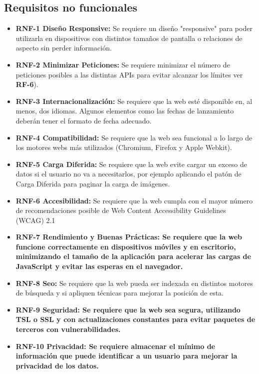 \subsection{Requisitos no funcionales}\label{requisitos-no-funcionales}
\begin{itemize}
    \item \textbf{RNF-1 Diseño Responsive:} Se requiere un diseño "responsive" para poder utilizarla en dispositivos con distintos tamaños de pantalla o relaciones de aspecto sin perder información.
    \item \textbf{RNF-2 Minimizar Peticiones:} Se requiere minimizar el número de peticiones posibles a las  distintas APIs para evitar alcanzar los límites ver \textbf{RF-6}). 
    \item \textbf{RNF-3 Internacionalización:} Se requiere que la web esté disponible en, al menos, dos idiomas. Algunos elementos como las fechas de lanzamiento deberán tener el formato de fecha adecuado. 
    
    \item\textbf{RNF-4 Compatibilidad:} Se requiere que la web sea funcional a lo largo de los motores webs más utilizados (Chromium, Firefox y Apple Webkit).
    \item\textbf{RNF-5 Carga Diferida:} Se requiere que la web evite cargar un exceso de datos si el usuario no va a necesitarlos, por ejemplo aplicando el patón de Carga Diferida para paginar la carga de imágenes.
    \item\textbf{RNF-6 Accesibilidad:} Se requiere que la web cumpla con el mayor número de recomendaciones posible de Web Content Accessibility Guidelines (WCAG) 2.1
    \item\textbf{RNF-7 Rendimiento y Buenas Prácticas: Se requiere que la web funcione correctamente en dispositivos móviles y en escritorio, minimizando el tamaño de la aplicación para acelerar las cargas de JavaScript y evitar las esperas en el navegador.}
    \item\textbf{RNF-8 Seo:} Se requiere que la web pueda ser indexada en distintos motores de búsqueda y si apliquen técnicas para mejorar la posición de esta.
    \item\textbf{RNF-9 Seguridad: Se requiere que la web sea segura, utilizando TSL o SSL y con actualizaciones constantes para evitar paquetes de terceros con vulnerabilidades.}
    \item\textbf{RNF-10 Privacidad: Se requiere almacenar el mínimo de información que puede identificar a un usuario para mejorar la privacidad de los datos.}
\end{itemize}





